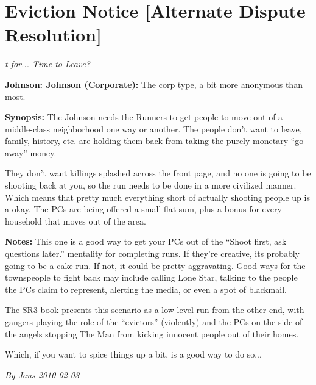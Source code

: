 \documentclass[letterpaper,twocolumn,10.5pt]{article}
\newenvironment{scenario}[6]
	{
		\section{#1 {\small[#2]}}
		\textit{#3}
		\def\TMPSCENARIO{#4 #5}
	}
	{\small\textit{By \TMPSCENARIO}}
\newcommand{\johnson}[2]{\textbf{Johnson: #1 (#2):}}
\newcommand{\synopsis}{\textbf{Synopsis: }}
\newcommand{\notes}{\textbf{Notes: }}
\begin{document}
\begin{scenario}{Eviction Notice}
	{Alternate Dispute Resolution}
	{ t for... Time to Leave?}
	{Jans}
	{2010-02-03}
	{https://forum.rpg.net/showthread.php?321504-Shadowrun-4th-101-Instant-Scenarios\&p=11637133#post11637133}

\johnson{Johnson}{Corporate}  The corp type, a bit more anonymous than most.

\synopsis The Johnson needs the Runners to get people to move out of a middle-class neighborhood one way or another. The people don't want to leave, family, history, etc. are holding them back from taking the purely monetary ``go-away'' money.

They don't want killings splashed across the front page, and no one is going to be shooting back at you, so the run needs to be done in a more civilized manner. Which means that pretty much everything short of actually shooting people up is a-okay. The PCs are being offered a small flat sum, plus a bonus for every household that moves out of the area.

\notes This one is a good way to get your PCs out of the ``Shoot first, ask questions later.'' mentality for completing runs. If they're creative, its probably going to be a cake run. If not, it could be pretty aggravating. Good ways for the townspeople to fight back may include calling Lone Star, talking to the people the PCs claim to represent, alerting the media, or even a spot of blackmail.

The SR3 book presents this scenario as a low level run from the other end, with gangers playing the role of the ``evictors'' (violently) and the PCs on the side of the angels stopping The Man from kicking innocent people out of their homes.

Which, if you want to spice things up a bit, is a good way to do so... 

\end{scenario}
\end{document}
